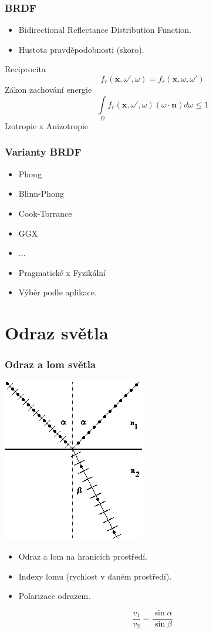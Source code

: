\begin{frame}
    \frametitle{BRDF}
    \begin{itemize}
        \item Bidirectional Reflectance Distribution Function.
        \item Hustota pravděpodobnosti (skoro).
    \end{itemize}
    \pause\vfill
    Reciprocita
    \begin{equation*}
        f_r(\mathbf x, \omega', \omega) = f_r(\mathbf x, \omega, \omega')
    \end{equation*}
    Zákon zachování energie
    \begin{equation*}
        \int\limits_\Omega f_r(\mathbf x, \omega', \omega) (\omega \cdot \mathbf n) d\omega \le 1
    \end{equation*}
    Izotropie x Anizotropie
\end{frame}

\begin{frame}
    \frametitle{Varianty BRDF}
    \begin{itemize}
        \item Phong
        \item Blinn-Phong
        \item Cook-Torrance
        \item GGX
        \item ...
    \end{itemize}
    \pause\vfill
    \begin{itemize}
        \item Pragmatické x Fyzikální
        \item Výběr podle aplikace.
    \end{itemize}
\end{frame}

\section{Odraz světla}

\begin{frame}
    \frametitle{Odraz a lom světla}
    \includegraphics[width=.3\textwidth]{pics/physicallyBasedRendering/image106}
    \begin{itemize}
        \item Odraz a lom na hranicích prostředí.
        \item Indexy lomu (rychlost v daném prostředí).
        \item Polarizace odrazem.
    \end{itemize}
    \begin{equation*}
        \frac{v_1}{v_2} = \frac{\sin\alpha}{\sin\beta}
    \end{equation*}
\end{frame}


